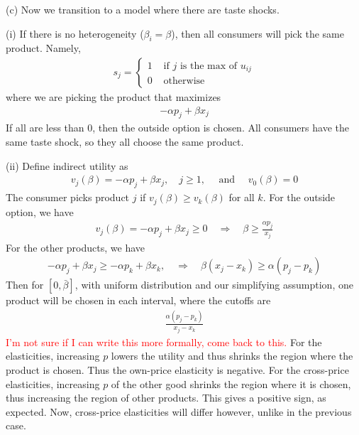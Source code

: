 (c)
Now we transition to a model where there are taste shocks. 

(i) If there is no heterogeneity ($\beta_i=\beta$), then all consumers will pick the same product. Namely, 
\begin{align*}
s_j= \begin{cases}1 & \text { if } j \text { is the max of } u_{i j}  \\ 0 & \text { otherwise } \end{cases}
\end{align*}
where we are picking the product that maximizes 
\begin{align*}
-\alpha p_j+\beta x_j
\end{align*}
If all are less than 0, then the outside option is chosen.
All consumers have the same taste shock, so they all choose the same product.

(ii)
Define indirect utility as
\begin{align*}
v_j(\beta)=-\alpha p_j+\beta x_j, \quad j \geq 1, \quad \text { and } \quad v_0(\beta)=0
\end{align*}
The consumer picks product $j$ if $v_j(\beta) \geq v_k(\beta)$ for all $k$.
For the outside option, we have
\begin{align*}
v_j(\beta)=-\alpha p_j+\beta x_j \geq 0 \quad \Longrightarrow \quad \beta \geq \frac{\alpha p_j}{x_j}
\end{align*}
For the other products, we have
\begin{align*}
-\alpha p_j+\beta x_j \geq-\alpha p_k+\beta x_k, \quad \Longrightarrow \quad \beta\left(x_j-x_k\right) \geq \alpha\left(p_j-p_k\right)
\end{align*}
Then for $[0, \bar{\beta}]$, with uniform distribution and our simplifying assumption, one product will be chosen in each interval, where the cutoffs are
\begin{align*}
\frac{\alpha\left(p_j-p_k\right)}{x_j-x_k}
\end{align*}
\textcolor{red}{I'm not sure if I can write this more formally, come back to this.} 
For the elasticities, increasing $p$ lowers the utility and thus shrinks the region where the product is chosen. Thus the own-price elasticity is negative.
For the cross-price elasticities, increasing $p$ of the other good shrinks the region where it is chosen, thus increasing the region of other products. This gives a positive sign, as expected.
Now, cross-price elasticities will differ however, unlike in the previous case. 

